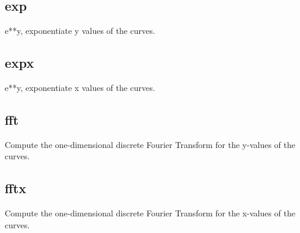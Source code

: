 \documentclass[letterpaper,10pt,english]{sphinxmanual}
\begin{document}
\subsection{exp}
\label{\detokenize{math_operations:exp}}
e**y, exponentiate y values of the curves.

\begin{sphinxVerbatim}[commandchars=\\\{\}]
\PYG{p}{[}\PYG{p}{]}  
\end{sphinxVerbatim}


\subsection{expx}
\label{\detokenize{math_operations:expx}}
e**y, exponentiate x values of the curves.

\begin{sphinxVerbatim}[commandchars=\\\{\}]
\PYG{p}{[}\PYG{p}{]}  
\end{sphinxVerbatim}


\subsection{fft}
\label{\detokenize{math_operations:fft}}
Compute the one-dimensional discrete Fourier Transform for the y-values of the curves.

\begin{sphinxVerbatim}[commandchars=\\\{\}]
\PYG{p}{[}\PYG{p}{]}  
\end{sphinxVerbatim}


\subsection{fftx}
\label{\detokenize{math_operations:fftx}}
Compute the one-dimensional discrete Fourier Transform for the x-values of the curves.

\begin{sphinxVerbatim}[commandchars=\\\{\}]
\PYG{p}{[}\PYG{p}{]}  
\end{sphinxVerbatim}
\end{document}
